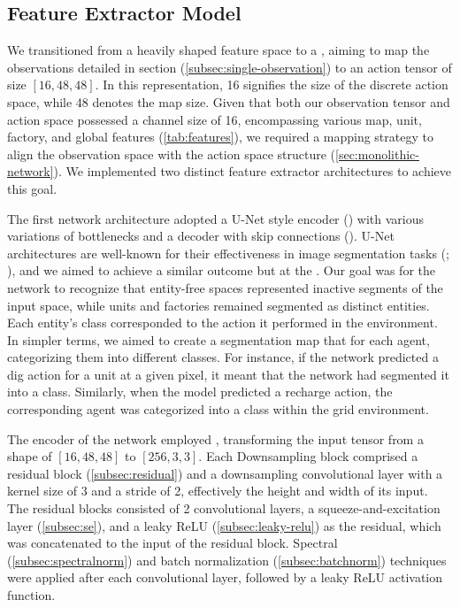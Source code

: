 \subsection{Feature Extractor Model}
\label{sec:monolithic-network}

\noindent We transitioned from a heavily shaped feature space to a , aiming to map the observations detailed in section (\autoref{subsec:single-observation}) to an action tensor of size $[16, 48, 48]$. In this representation, 16 signifies the size of the discrete action space, while 48 denotes the map size. Given that both our observation tensor and action space possessed a channel size of 16, encompassing various map, unit, factory, and global features (\autoref{tab:features}), we required a mapping strategy to align the observation space with the action space structure (\autoref{sec:monolithic-network}). We implemented two distinct feature extractor architectures to achieve this goal.

\bigskip

\noindent The first network architecture adopted a U-Net style encoder (\cite{ronneberger2015unet}) with various variations of bottlenecks and a decoder with skip connections (\cite{wu2020skip}). U-Net architectures are well-known for their effectiveness in image segmentation tasks (\cite{ehab2023performance}; \cite{ronneberger2015unet}), and we aimed to achieve a similar outcome but at the . Our goal was for the network to recognize that entity-free spaces represented inactive segments of the input space, while units and factories remained segmented as distinct entities. Each entity's class corresponded to the action it performed in the environment. In simpler terms, we aimed to create a segmentation map that  for each agent, categorizing them into different classes. For instance, if the network predicted a dig action for a unit at a given pixel, it meant that the network had segmented it into a  class. Similarly, when the model predicted a recharge action, the corresponding agent was categorized into a  class within the grid environment.

\bigskip

\noindent The encoder of the network employed , transforming the input tensor from a shape of $[16, 48, 48]$ to $[256,3,3]$. Each Downsampling block comprised a residual block (\autoref{subsec:residual}) and a downsampling convolutional layer with a kernel size of 3 and a stride of 2, effectively  the height and width of its input. The residual blocks consisted of 2 convolutional layers, a squeeze-and-excitation layer (\autoref{subsec:se}), and a leaky ReLU (\autoref{subsec:leaky-relu}) as the residual, which was concatenated to the input of the residual block. Spectral (\autoref{subsec:spectralnorm}) and batch normalization (\autoref{subsec:batchnorm}) techniques were applied after each convolutional layer, followed by a leaky ReLU activation function.

